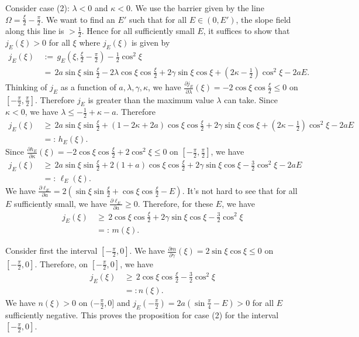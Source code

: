 \documentclass[11 pt]{article}
\renewcommand\l{\lambda}
\renewcommand\({\left(}
\renewcommand\){\right)}
\newcommand\<{\langle}
\renewcommand\>{\rangle}
\renewcommand\l{\lambda}
\newcommand\g{\gamma}
\newcommand\8{\infty}
\newcommand{\pd}{\partial}
\begin{document}
Consider case (2): $\l < 0$ and $\kappa < 0$. We  use the barrier given by the line $\Omega = \frac{\xi}{2} - \frac{\pi}{2}$. We want to find an $E'$ such that for all $E \in (0,E')$, the slope field along this line is $> \frac{1}{2}$. Hence for all sufficiently small $E$, it suffices to show that $j_E(\xi) > 0$ for all $\xi$ where $j_E(\xi)$ is given by   
\begin{align*}
j_{E}(\xi) \,&:=\, g_E\left(\xi, \frac{\xi}{2} - \frac{\pi}{2}\right) - \frac{1}{2}\cos^2\xi
\\
&=\, 2a\sin\xi\sin\frac{\xi}{2} -2\l\cos\xi\cos\frac{\xi}{2} + 2\gamma \sin \xi \cos \xi + (2\kappa - \frac{1}{2})\cos^2\xi - 2aE.
\end{align*}
Thinking of $j_E$ as a function of $a, \l, \g, \kappa$, we have $\frac{\pd j_E}{\pd \l}(\xi) = -2\cos \xi \cos \frac{\xi}{2} \leq 0$ on $[-\frac{\pi}{2}, \frac{\pi}{2}]$. Therefore $j_E$ is greater than the maximum value $\lambda$ can take. Since $\kappa < 0$, we have $\lambda \leq -\frac{1}{2} + \kappa -a $. Therefore
\begin{align*}
j_E(\xi) \,&\geq\, 2a\sin\xi\sin\frac{\xi}{2} + (1 - 2\kappa + 2a)\cos\xi\cos\frac{\xi}{2} + 2\gamma \sin \xi \cos \xi + (2\kappa - \frac{1}{2})\cos^2\xi - 2aE
\\
&=:\, h_E(\xi).
\end{align*}
Since $\frac{\pd h_E}{\pd \kappa}(\xi) = -2\cos \xi \cos \frac{\xi}{2} + 2 \cos^2\xi \leq 0$ on $[-\frac{\pi}{2}, \frac{\pi}{2}]$, we have 
\begin{align*}
j_E(\xi) \,&\geq\, 2a\sin \xi \sin \frac{\xi}{2} + 2(1+a)\cos \xi \cos \frac{\xi}{2} + 2\gamma \sin \xi \cos \xi - \frac{3}{2}\cos^2\xi - 2aE
\\
&=:\,\ell_E(\xi).
\end{align*}
We have $\frac{\pd \ell_E}{\pd a} = 2(\sin\xi \sin\frac{\xi}{2} + \cos\xi\cos\frac{\xi}{2} - E)$. It's not hard to see that for all $E$ sufficiently small, we have $\frac{\pd \ell_E}{\pd a} \geq 0$. Therefore, for these $E$, we have 
\begin{align*}
j_E(\xi) \,&\geq\,  2\cos\xi \cos\frac{\xi}{2} + 2\gamma \sin \xi \cos \xi - \frac{3}{2}\cos^2\xi
\\
&=:\, m(\xi). 
\end{align*}




Consider first the interval $[-\frac{\pi}{2}, 0]$. We have $\frac{\pd m}{\pd \gamma}(\xi) = 2\sin \xi \cos \xi \leq 0$ on $[-\frac{\pi}{2}, 0]$. Therefore, on $[-\frac{\pi}{2}, 0]$, we have
\begin{align*}
j_E(\xi) \,&\geq\, 2\cos\xi \cos\frac{\xi}{2} - \frac{3}{2}\cos^2\xi
\\
&=: 
n(\xi).
\end{align*}
We have $n(\xi) > 0$ on $(-\frac{\pi}{2},0]$ and $j_E(-\frac{\pi}{2}) = 2a(\sin\frac{\pi}{4}-E) > 0$ for all $E$ sufficiently negative. This proves the proposition for case (2) for the interval $[-\frac{\pi}{2}, 0]$.
\end{document}
